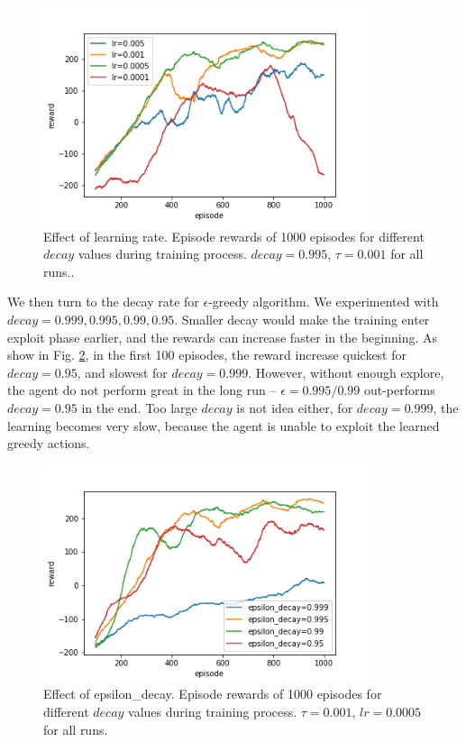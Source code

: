 \documentclass[conference]{IEEEtran}
\begin{document}
	\begin{figure}
		\includegraphics[height=2.5in]{figures/lr.png} 
		\caption{Effect of learning rate. Episode rewards of 1000 episodes for different $decay$ values during training process. $decay=0.995$, $\tau=0.001$ for all runs..}
		\label{fig:lr}
	\end{figure}

We then turn to the decay rate for $\epsilon$-greedy algorithm. We experimented with $decay = 0.999, 0.995, 0.99, 0.95$. Smaller decay would make the training enter exploit phase earlier, and the rewards can increase faster in the beginning. As show in Fig. \ref{fig:epsilon_decay}, in the first 100 episodes, the reward increase quickest for $decay = 0.95$, and slowest for $decay = 0.999$. However, without enough explore, the agent do not perform great in the long run -- $\epsilon = 0.995/0.99$ out-performs $decay = 0.95$ in the end. Too large $decay$ is not idea either, for $decay = 0.999$, the learning becomes very slow, because the agent is unable to exploit the learned greedy actions.

	\begin{figure}
		\includegraphics[height=2.5in]{figures/epsilon_decay.png} 
		\caption{Effect of epsilon\_decay. Episode rewards of 1000 episodes for different $decay$ values during training process. $\tau=0.001$, $lr=0.0005$ for all runs.}
		\label{fig:epsilon_decay}
	\end{figure}
	
\end{document}
